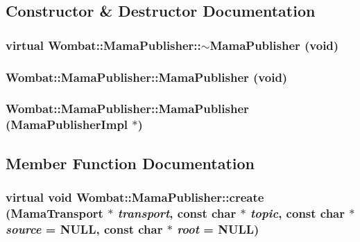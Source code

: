 \subsection{Constructor \& Destructor Documentation}
\hypertarget{classWombat_1_1MamaPublisher_a5d7284e816e67426cb288b6eb64ddca9}{
\subsubsection[{$\sim$MamaPublisher}]{\setlength{\rightskip}{0pt plus 5cm}virtual Wombat::MamaPublisher::$\sim$MamaPublisher (void)}}
\label{classWombat_1_1MamaPublisher_a5d7284e816e67426cb288b6eb64ddca9}
\hypertarget{classWombat_1_1MamaPublisher_af793def52ce7ce836557c746de43fa92}{
\subsubsection[{MamaPublisher}]{\setlength{\rightskip}{0pt plus 5cm}Wombat::MamaPublisher::MamaPublisher (void)}}
\label{classWombat_1_1MamaPublisher_af793def52ce7ce836557c746de43fa92}
\hypertarget{classWombat_1_1MamaPublisher_ae1b9a885437a0b6509937eb57586671c}{
\subsubsection[{MamaPublisher}]{\setlength{\rightskip}{0pt plus 5cm}Wombat::MamaPublisher::MamaPublisher (MamaPublisherImpl $\ast$)}}
\label{classWombat_1_1MamaPublisher_ae1b9a885437a0b6509937eb57586671c}


\subsection{Member Function Documentation}
\hypertarget{classWombat_1_1MamaPublisher_ad0fdacd5fd5150799f74396e27212368}{
\subsubsection[{create}]{\setlength{\rightskip}{0pt plus 5cm}virtual void Wombat::MamaPublisher::create ({\bf MamaTransport} $\ast$ {\em transport}, \/  const char $\ast$ {\em topic}, \/  const char $\ast$ {\em source} = {\ttfamily NULL}, \/  const char $\ast$ {\em root} = {\ttfamily NULL})}}
\label{classWombat_1_1MamaPublisher_ad0fdacd5fd5150799f74396e27212368}


